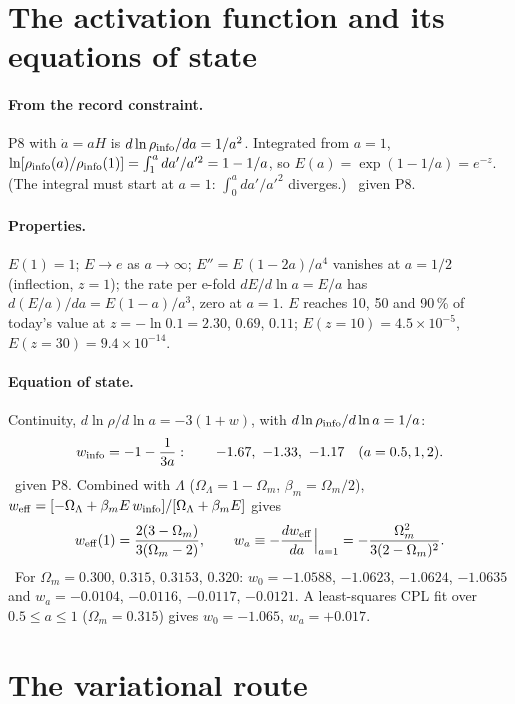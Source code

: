 \section{The activation function and its equations of state}\label{app:der:activation}
\paragraph{From the record constraint.} P8 with $\dot a=aH$ is $d\ln\rho_{\rm info}/da=1/a^2$. Integrated from $a=1$,
$\ln[\rho_{\rm info}(a)/\rho_{\rm info}(1)]=\int_1^ada'/a'^2=1-1/a$, so $E(a)=\exp(1-1/a)=e^{-z}$. (The integral must start at $a=1$:
$\int_0^ada'/a'^2$ diverges.) \derived\ given P8.

\paragraph{Properties.} $E(1)=1$; $E\to e$ as $a\to\infty$; $E''=E\,(1-2a)/a^4$ vanishes at $a=1/2$ (inflection, $z=1$); the rate per e-fold
$dE/d\ln a=E/a$ has $d(E/a)/da=E(1-a)/a^3$, zero at $a=1$. $E$ reaches 10, 50 and 90\,\% of today's value at $z=-\ln0.1=2.30$, $0.69$, $0.11$;
$E(z{=}10)=4.5\times10^{-5}$, $E(z{=}30)=9.4\times10^{-14}$. \calc

\paragraph{Equation of state.} Continuity, $d\ln\rho/d\ln a=-3(1+w)$, with $d\ln\rho_{\rm info}/d\ln a=1/a$:
\begin{equation}
w_{\rm info}=-1-\frac{1}{3a}:\qquad-1.67,\ -1.33,\ -1.17\quad(a=0.5,1,2). \label{der:winfo}
\end{equation}
\derived\ given P8. Combined with $\Lambda$ ($\Omega_\Lambda=1-\Omega_m$, $\beta_m=\Omega_m/2$),
$w_{\rm eff}=[-\Omega_\Lambda+\beta_mE\,w_{\rm info}]/[\Omega_\Lambda+\beta_mE]$ gives
\begin{equation}
w_{\rm eff}(1)=\frac{2(3-\Omega_m)}{3(\Omega_m-2)},\qquad w_a\equiv-\frac{dw_{\rm eff}}{da}\Big|_{a=1}=-\frac{\Omega_m^2}{3(2-\Omega_m)^2}.
\end{equation}
\derived\ For $\Omega_m=0.300$, $0.315$, $0.3153$, $0.320$: $w_0=-1.0588$, $-1.0623$, $-1.0624$, $-1.0635$ and $w_a=-0.0104$, $-0.0116$, $-0.0117$, $-0.0121$.
A least-squares CPL fit over $0.5\le a\le1$ ($\Omega_m=0.315$) gives $w_0=-1.065$, $w_a=+0.017$. \calc

\section{The variational route}\label{app:der:variational}
